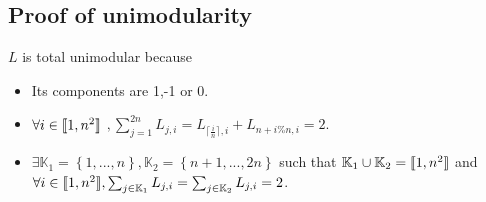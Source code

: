 \documentclass{CSArticle}[english]
\begin{document}
\subsection{Proof of unimodularity}
$L$ is total unimodular because
\begin{itemize}
    \item Its components are 1,-1 or 0.
    \item $\forall i \in \llbracket1,n^2\rrbracket$ $, \sum_{j=1}^{2n}{L_{j,i}}=L_{\lceil \frac{i}{n} \rceil ,i}+L_{n+i\%n,i}=2$.
    \item $\exists \mathbb{K} _1=\left\{ 1,...,n \right\} , \mathbb{K} _2=\left\{ n+1,...,2n \right\} $ such that $\mathbb{K} _1\cup \mathbb{K} _2=\llbracket1,n^2\rrbracket$ and  $\forall i \in \llbracket1,n^2\rrbracket, \sum_{j\in \mathbb{K} _1}{L_{j,i}}=\sum_{j\in \mathbb{K} _2}{L_{j,i}}=2$.
\end{itemize}
\end{document}
